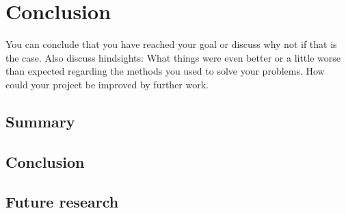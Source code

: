\chapter{Conclusion}

You can conclude that you have reached your goal or discuss why not if that is the case. Also discuss hindsights: What things were even better or a little worse than expected regarding the methods you used to solve your problems. How could your project be improved by further work.

\section{Summary}

\section{Conclusion}

\section{Future research} %
\label{sec:section name}


